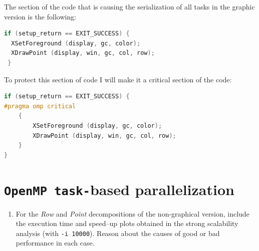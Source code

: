\documentclass[a4paper]{article}
\begin{document}
The section of the code that is causing the serialization of all tasks in the graphic version is the following:

\begin{lstlisting}[language=C]
 if (setup_return == EXIT_SUCCESS) {
  XSetForeground (display, gc, color);
  XDrawPoint (display, win, gc, col, row);
 }           
\end{lstlisting}

To protect this section of code I will make it a critical section of the code:

\begin{lstlisting}[language=C]
if (setup_return == EXIT_SUCCESS) {
#pragma omp critical
	{
		XSetForeground (display, gc, color);
		XDrawPoint (display, win, gc, col, row);
	}
}           
\end{lstlisting}

\section{\texttt{OpenMP task-}based parallelization}

\begin{enumerate}
	\item For the \textit{Row} and \textit{Point} decompositions of the non-graphical version, include the execution time and speed–up plots obtained in the strong scalability analysis (with \texttt{-i 10000}). Reason about the causes of good or bad performance in each case.
\end{enumerate}
\end{document}
